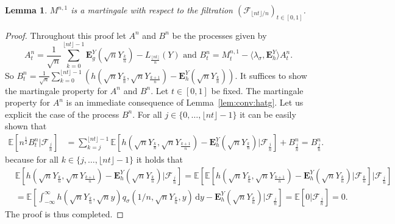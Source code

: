 \documentclass[12pt]{article}
\numberwithin{equation}{section}
\newtheorem{lemma}{Lemma}
\theoremstyle{definition}
\theoremstyle{remark}
\newcommand{\EE}{\mathbb{E}}
\newcommand{\cF}{\mathcal{F}}
\newcommand{\vd}{\,\mathrm{d}}
\newcommand{\bfH}[1]{\mathbf{E}^Y_{#1}}
\begin{document}
\begin{lemma}  \label{lem:M:mart}
	$M^{n,1}$ is a martingale with respect to the filtration $(\cF_{\lfloor n t \rfloor/n})_{t\in [0,1]}$. 
\end{lemma}
\begin{proof}
Throughout this proof let $A^n$ and $B^n$ be the processes given by
\begin{equation}
	A^n_t 
	= \frac1{\sqrt{n}}  \sum_{k=0}^{\lfloor n t \rfloor-1} \bfH{g}(\sqrt{n} Y_{\frac{k}n}) - L_{\frac{\lfloor n t \rfloor}n}(Y) 
\text{ and }
	B^n_t = M^{n,1}_t - \langle \lambda_\sigma , \bfH h \rangle A^n_t.
\end{equation}
So
$ B^n_t = \frac1{\sqrt{n}} \sum_{k=0}^{\lfloor n t \rfloor-1} \left( h(\sqrt{n} Y_{\frac{k}{n}}, \sqrt{n} Y_{\frac{k+1}{n}} ) - \bfH h( \sqrt{n} Y_{\frac{k}n}) \right).
$
It suffices to show the martingale property for $A^n$ and $B^n$.
Let $t\in [0,1]$ be fixed. 
The martingale property for $A^n$ is an immediate consequence of Lemma~\ref{lem:conv:hatg}.
Let us explicit the case of the process $B^n$.
For all $j\in \{0,\ldots, \lfloor n t \rfloor-1\}$ 
it can be easily shown that
\begin{equation} 
\begin{split}
	\EE\!\left[  n^{\frac12} B^{n}_t | \cF_{\frac j n} \right]
 	& =
	\sum_{k=j}^{\lfloor n t \rfloor-1} \EE\!\left[  h(\sqrt{n} Y_{\frac{k}{n}}, \sqrt{n} Y_{\frac{k+1}{n}} ) - \bfH h( \sqrt{n} Y_{\frac{k}n}) | \cF_{\frac j n} \right] + B^{n}_{\frac j n}
= B^{n}_{\frac j n}.
\end{split}
\end{equation}
because for all $k \in \{j,\ldots, \lfloor n t \rfloor-1\}$ it holds that
\begin{equation} 
\begin{split}
	& \EE\!\left[  h(\sqrt{n} Y_{\frac{k}{n}}, \sqrt{n} Y_{\frac{k+1}{n}} ) - \bfH h( \sqrt{n} Y_{\frac{k}n}) | \cF_{\frac j n} \right]
	= \EE\!\left[  \EE\!\left[  h(\sqrt{n} Y_{\frac{k}{n}}, \sqrt{n} Y_{\frac{k+1}{n}} ) - \bfH h( \sqrt{n} Y_{\frac{k}n}) | \cF_{\frac k n} \right] | \cF_{\frac j n} \right]
	\\
	&
	= \EE\!\left[ \int_{-\infty}^{\infty} h(\sqrt{n} Y_{\frac{k}{n}}, \sqrt{n} y ) q_\sigma(1/n, \sqrt{n} Y_{\frac{k}{n}}, y)  \vd y - \bfH h( \sqrt{n} Y_{\frac{k}n})  | \cF_{\frac j n} \right] 
	= \EE\!\left[ 0  | \cF_{\frac j n} \right] =0.
\end{split}
\end{equation}
The proof is thus completed. %
\end{proof}
\end{document}
